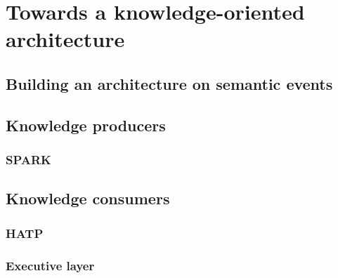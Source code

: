 \chapter{Towards a knowledge-oriented architecture}
\label{chapter|architecture}

\section{Building an architecture on semantic events}
\label{sect|events}

\section{Knowledge producers}
\label{sect|producers}

\subsection{SPARK}
\label{subssect|spark}

\section{Knowledge consumers}
\label{sect|consumers}

\subsection{HATP}
\label{subssect|hatp}

\subsection{Executive layer}
\label{subssect|supervision}
